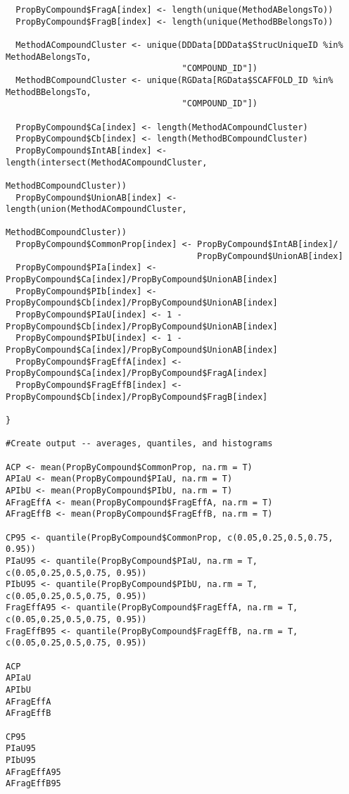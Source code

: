 \documentclass[11pt,letterpaper]{article}
\begin{document}
\begin{verbatim}
  PropByCompound$FragA[index] <- length(unique(MethodABelongsTo))
  PropByCompound$FragB[index] <- length(unique(MethodBBelongsTo))
  
  MethodACompoundCluster <- unique(DDData[DDData$StrucUniqueID %in% MethodABelongsTo,
                                   "COMPOUND_ID"])
  MethodBCompoundCluster <- unique(RGData[RGData$SCAFFOLD_ID %in% MethodBBelongsTo,
                                   "COMPOUND_ID"])
  
  PropByCompound$Ca[index] <- length(MethodACompoundCluster)
  PropByCompound$Cb[index] <- length(MethodBCompoundCluster)
  PropByCompound$IntAB[index] <- length(intersect(MethodACompoundCluster,
                                                  MethodBCompoundCluster))
  PropByCompound$UnionAB[index] <- length(union(MethodACompoundCluster,
                                                    MethodBCompoundCluster))
  PropByCompound$CommonProp[index] <- PropByCompound$IntAB[index]/
                                      PropByCompound$UnionAB[index]
  PropByCompound$PIa[index] <- PropByCompound$Ca[index]/PropByCompound$UnionAB[index]
  PropByCompound$PIb[index] <- PropByCompound$Cb[index]/PropByCompound$UnionAB[index]
  PropByCompound$PIaU[index] <- 1 - PropByCompound$Cb[index]/PropByCompound$UnionAB[index]
  PropByCompound$PIbU[index] <- 1 - PropByCompound$Ca[index]/PropByCompound$UnionAB[index]
  PropByCompound$FragEffA[index] <- PropByCompound$Ca[index]/PropByCompound$FragA[index]
  PropByCompound$FragEffB[index] <- PropByCompound$Cb[index]/PropByCompound$FragB[index]
  
}

#Create output -- averages, quantiles, and histograms

ACP <- mean(PropByCompound$CommonProp, na.rm = T)
APIaU <- mean(PropByCompound$PIaU, na.rm = T)
APIbU <- mean(PropByCompound$PIbU, na.rm = T)
AFragEffA <- mean(PropByCompound$FragEffA, na.rm = T)
AFragEffB <- mean(PropByCompound$FragEffB, na.rm = T)

CP95 <- quantile(PropByCompound$CommonProp, c(0.05,0.25,0.5,0.75, 0.95))
PIaU95 <- quantile(PropByCompound$PIaU, na.rm = T, c(0.05,0.25,0.5,0.75, 0.95))
PIbU95 <- quantile(PropByCompound$PIbU, na.rm = T, c(0.05,0.25,0.5,0.75, 0.95))
FragEffA95 <- quantile(PropByCompound$FragEffA, na.rm = T, c(0.05,0.25,0.5,0.75, 0.95))
FragEffB95 <- quantile(PropByCompound$FragEffB, na.rm = T, c(0.05,0.25,0.5,0.75, 0.95))

ACP
APIaU
APIbU
AFragEffA
AFragEffB

CP95
PIaU95
PIbU95
AFragEffA95
AFragEffB95


\end{verbatim}
\end{document}

